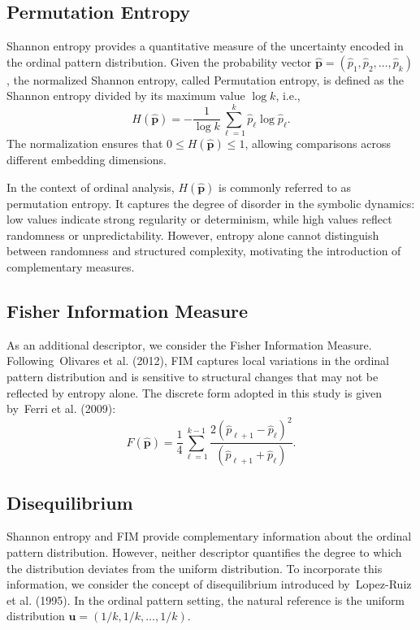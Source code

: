 \documentclass[
  conference]{IEEEtran}
\begin{document}
\subsection{Permutation Entropy}\label{permutation-entropy}

Shannon entropy provides a quantitative measure of the uncertainty
encoded in the ordinal pattern distribution. Given the probability
vector
\(\widehat{\mathbf{p}} = (\widehat{p}_1,\widehat{p}_{2},\dots,\widehat{p}_k)\),
the normalized Shannon entropy, called Permutation entropy, is defined
as the Shannon entropy divided by its maximum value \(\log k\), i.e., \[
H(\widehat{\mathbf p})
=
-\frac{1}{\log k}
\sum_{\ell=1}^{k}
\widehat p_\ell \log \widehat p_\ell.
\] The normalization ensures that \(0\le H(\widehat{\mathbf p})\le1\),
allowing comparisons across different embedding dimensions.

In the context of ordinal analysis, \(H(\widehat{\mathbf{p}})\) is
commonly referred to as permutation entropy. It captures the degree of
disorder in the symbolic dynamics: low values indicate strong regularity
or determinism, while high values reflect randomness or
unpredictability. However, entropy alone cannot distinguish between
randomness and structured complexity, motivating the introduction of
complementary measures.

\subsection{Fisher Information
Measure}\label{fisher-information-measure}

As an additional descriptor, we consider the Fisher Information Measure.
Following~Olivares et al. (2012), FIM captures local variations in the
ordinal pattern distribution and is sensitive to structural changes that
may not be reflected by entropy alone. The discrete form adopted in this
study is given by~Ferri et al. (2009): \[
F(\widehat{\mathbf p})
=
\frac{1}{4}
\sum_{\ell=1}^{k-1}
\frac{2(\widehat p_{\ell+1}-\widehat p_\ell)^2}
{(\widehat p_{\ell+1}+\widehat p_\ell)}.
\]

\subsection{Disequilibrium}\label{disequilibrium}

Shannon entropy and FIM provide complementary information about the
ordinal pattern distribution. However, neither descriptor quantifies the
degree to which the distribution deviates from the uniform distribution.
To incorporate this information, we consider the concept of
disequilibrium introduced by~Lopez-Ruiz et al. (1995). In the ordinal
pattern setting, the natural reference is the uniform distribution
\(\mathbf{u}=(1/k,1/k,\ldots,1/k)\).
\end{document}
